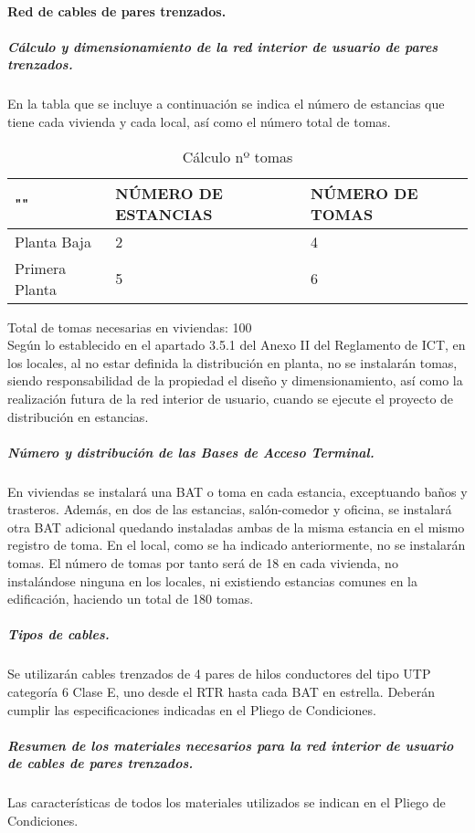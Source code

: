 \paragraph{Red de cables de pares trenzados.}
\subparagraph{Cálculo y dimensionamiento de la red interior de usuario de pares trenzados.}
En la tabla que se incluye a continuación se indica el número de estancias que tiene cada
vivienda y cada local, así como el número total de tomas.
\begin{table}[H]
\centering
\begin{tabular}{p{5cm} p{5cm} p{5cm}}
\hline
""&NÚMERO DE ESTANCIAS&NÚMERO DE TOMAS\\
\hline \hline
Planta Baja&2&4\\
\hline
Primera Planta&5&6\\
\end{tabular}
\caption{Cálculo nº tomas}
\label{tabla:autores}
\end{table}
Total de tomas necesarias en viviendas: 100\\
Según lo establecido en el apartado 3.5.1 del Anexo II del Reglamento de ICT, en los locales, al
no estar definida la distribución en planta, no se instalarán tomas, siendo responsabilidad de la
propiedad el diseño y dimensionamiento, así como la realización futura de la red interior de
usuario, cuando se ejecute el proyecto de distribución en estancias.
\subparagraph{Número y distribución de las Bases de Acceso Terminal.}
En viviendas se instalará una BAT o toma en cada estancia, exceptuando baños y trasteros.
Además, en dos de las estancias, salón-comedor y oficina, se instalará otra BAT adicional
quedando instaladas ambas de la misma estancia en el mismo registro de toma.
En el local, como se ha indicado anteriormente, no se instalarán tomas.
El número de tomas por tanto será de 18 en cada vivienda, no instalándose ninguna en los locales,
ni existiendo estancias comunes en la edificación, haciendo un total de 180 tomas.
\subparagraph{Tipos de cables.}
Se utilizarán cables trenzados de 4 pares de hilos conductores del tipo UTP categoría 6 Clase E,
uno desde el RTR hasta cada BAT en estrella.
Deberán cumplir las especificaciones indicadas en el Pliego de
Condiciones.
\subparagraph{Resumen de los materiales necesarios para la red interior de usuario de cables de pares trenzados.}
Las características de todos los materiales utilizados se indican en el Pliego de Condiciones.

